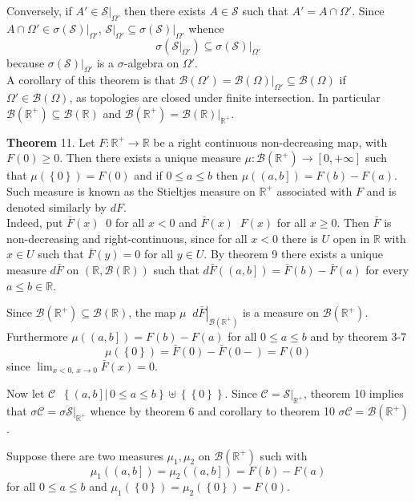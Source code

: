 \documentclass[a4paper]{article}
\newcommand{\obj}[1]{\left\{ #1 \right \}}
\newcommand{\clo}[1]{\left [ #1 \right ]}
\newcommand{\ploc}[1]{\left ( #1 \right ]}
\newcommand{\brac}[1]{\left ( #1 \right )}
\newcommand{\induc}[1]{\left . #1 \right \vert}
\newcommand{\Real}{\mathbb{R}}
\newcommand{\Zinf}{\clo{ 0, +\infty }}
\newcommand{\Ccal}{\mathcal{C}}
\newcommand{\Scal}{\mathcal{S}}
\newcommand{\borel}[1]{\mathcal{B}\brac{#1}}
\newcommand{\defn}{\mathop{\overset{\Delta}{=}}\nolimits}
\begin{document}
Conversely, if $A'\in\induc{\Scal}_{\Omega'}$ then there exists $A\in \Scal$ such that $A'=A\cap \Omega'$. Since $A\cap \Omega'\in\induc{\sigma\brac{\Scal}}_{\Omega'}$, $\induc{\Scal}_{\Omega'}\subseteq \induc{\sigma\brac{\Scal}}_{\Omega'}$ whence \[\sigma\brac{\induc{\Scal}_{\Omega'}}\subseteq \induc{\sigma\brac{\Scal}}_{\Omega'}\] because $\induc{\sigma\brac{\Scal}}_{\Omega'}$ is a $\sigma$-algebra on $\Omega'$.\\

A corollary of this theorem is that $\borel{\Omega'} = \induc{\borel{\Omega}}_{\Omega'} \subseteq \borel{\Omega}$ if $\Omega'\in \borel{\Omega}$, as topologies are closed under finite intersection. In particular $\borel{\Real^+}\subseteq \borel{\Real}$ and $\borel{\Real^+}=\induc{\borel{\Real}}_{\Real^+}$.

\label{thm:stieltjes_meas_rplus} \noindent \textbf{Theorem} 11.
Let $F:\Real^+\to\Real$ be a right continuous non-decreasing map, with $F\brac{0}\geq 0$. Then there exists a unique measure $\mu:\borel{\Real^+}\to\Zinf$ such that $\mu\brac{\obj{0}} = F\brac{0}$ and if $0\leq a\leq b$ then $\mu\brac{\ploc{a, b}} = F\brac{b} - F\brac{a}$. Such measure is known as the Stieltjes measure on $\Real^+$ associated with $F$ and is denoted similarly by $dF$.\\

Indeed, put $\bar{F}\brac{x}\defn0$ for all $x<0$ and $\bar{F}\brac{x}\defn F\brac{x}$ for all $x\geq0$. Then $\bar{F}$ is non-decreasing and right-continuous, since for all $x<0$ there is $U$ open in $\Real$ with $x\in U$ such that $\bar{F}\brac{y}=0$ for all $y\in U$. By theorem 9 there exists a unique measure $d\bar{F}$ on $\brac{\Real, \borel{\Real}}$ such that $d\bar{F}\brac{\ploc{a,b}}=\bar{F}\brac{b}-\bar{F}\brac{a}$ for every $a\leq b\in \Real$.

Since $\borel{\Real^+}\subseteq \borel{\Real}$, the map $\mu\defn \induc{d\bar{F}}_{\borel{\Real^+}}$ is a measure on $\borel{\Real^+}$. Furthermore $\mu\brac{\ploc{a,b}}=F\brac{b}-F\brac{a}$ for all $0\leq a\leq b$ and by theorem 3-7 \[\mu\brac{\obj{0}}=\bar{F}\brac{0}-\bar{F}\brac{0-}=F\brac{0}\] since $\lim_{x<0,\,x\to0} \bar{F}\brac{x}=0$.

Now let $\Ccal\defn \obj{\induc{\ploc{a,b}}\,0\leq a\leq b}\uplus\obj{\obj{0}}$. Since $\Ccal=\induc{\Scal}_{\Real^+}$, theorem 10 implies that $\sigma{\Ccal}=\induc{\sigma{\Scal}}_{\Real^+}$ whence by theorem 6 and corollary to theorem 10 $\sigma{\Ccal}=\borel{\Real^+}$.

Suppose there are two measures $\mu_1, \mu_2$ on $\borel{\Real^+}$ such with \[\mu_1\brac{\ploc{a,b}}=\mu_2\brac{\ploc{a,b}}=F\brac{b}-F\brac{a}\] for all $0\leq a\leq b$ and $\mu_1\brac{\obj{0}}=\mu_2\brac{\obj{0}}=F\brac{0}$.
\end{document}
